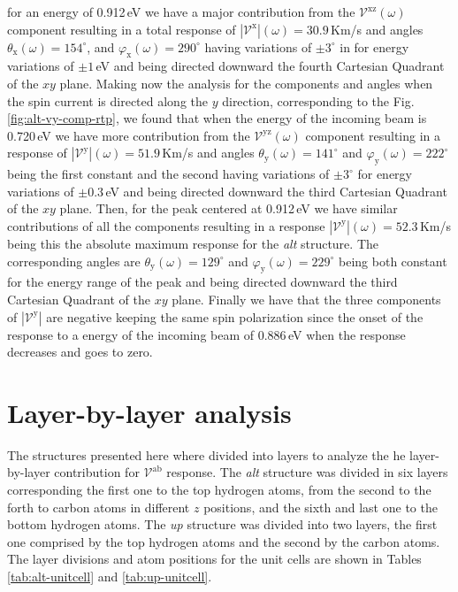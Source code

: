 \documentclass[prb,11pt,tightenlines,twocolumn,aps]{revtex4-1}
\begin{document}
% 
for an energy of 0.912\,eV we have a major contribution from the
$\mathcal{V}^{\mathrm{xz}}(\omega)$ component resulting in a total response of
$|\mathcal{V}^{\mathrm{x}}|(\omega)=30.9$\,Km/s and angles
$\theta_{\mathrm{x}}(\omega)=154^{\circ}$, and
$\varphi_{\mathrm{x}}(\omega)=290^{\circ}$ having variations of $\pm3^{\circ}$
in for energy variations of $\pm1$\,eV and being directed downward the fourth
Cartesian Quadrant of the $xy$ plane.
% 
Making now the analysis for the components and angles when the spin current is
directed along the $y$ direction, corresponding to the Fig.
% 
\ref{fig:alt-vy-comp-rtp}, we found that when the energy of the incoming beam is
0.720\,eV we have more contribution from the $\mathcal{V}^{\mathrm{yz}}(\omega)$
component resulting in a response of
$|\mathcal{V}^{\mathrm{y}}|(\omega)=51.9$\,Km/s and angles
$\theta_{\mathrm{y}}(\omega)=141^{\circ}$ and
$\varphi_{\mathrm{y}}(\omega)=222^{\circ}$ being the first constant and the
second having variations of $\pm3^{\circ}$ for energy variations of $\pm0.3$\,eV
and being directed downward the third Cartesian Quadrant of the $xy$ plane.
% 
Then, for the peak centered at 0.912\,eV we have similar contributions of all
the components resulting in a response
$|\mathcal{V}^{\mathrm{y}}|(\omega)=52.3$\,Km/s being this the absolute maximum
response for the \emph{alt} structure. The corresponding angles are
$\theta_{\mathrm{y}}(\omega)=129^{\circ}$ and
$\varphi_{\mathrm{y}}(\omega)=229^{\circ}$ being both constant for the energy
range of the peak and being directed downward the third Cartesian Quadrant of
the $xy$ plane.
% 
Finally we have that the three components of $|\mathcal{V}^{\mathrm{y}}|$ are
negative keeping the same spin polarization since the onset of the response to a
energy of the incoming beam of 0.886\,eV when the response decreases and goes to
zero.


\section{Layer-by-layer analysis} %
\label{sec:res-layer_by_layer_analysis}

The structures presented here where divided into layers to analyze the he
layer-by-layer contribution for $\mathcal{V}^{\mathrm{ab}}$ response. The
\emph{alt} structure was divided in six layers corresponding the first one to
the top hydrogen atoms, from the second to the forth to carbon atoms in
different $z$ positions, and the sixth and last one to the bottom hydrogen
atoms. The \emph{up} structure was divided into two layers, the first one
comprised by the top hydrogen atoms and the second by the carbon atoms. The
layer divisions and atom positions for the unit cells are shown in Tables
\ref{tab:alt-unitcell} and \ref{tab:up-unitcell}.
\end{document}
